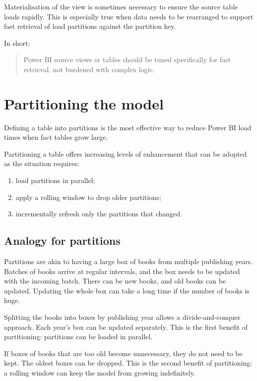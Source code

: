 \documentclass[10pt,openany,10pt]{book}
\providecommand{\tightlist}{%
  \setlength{\itemsep}{0pt}\setlength{\parskip}{0pt}}
\begin{document}
Materialisation of the view is sometimes necessary to ensure the source
table loads rapidly. This is especially true when data needs to be
rearranged to support fast retrieval of load partitions against the
partition key.

In short:

\begin{quote}
Power BI source views or tables should be tuned specifically for fast
retrieval, not burdened with complex logic.
\end{quote}

\section{Partitioning the model}\label{partitioning-the-model}

Defining a table into partitions is the most effective way to reduce
Power BI load times when fact tables grow large.

Partitioning a table offers increasing levels of enhancement that can be
adopted as the situation requires:

\begin{enumerate}
\def\labelenumi{\arabic{enumi}.}
\tightlist
\item
  load partitions in parallel;
\item
  apply a rolling window to drop older partitions;
\item
  incrementally refresh only the partitions that changed.
\end{enumerate}

\subsection{Analogy for partitions}\label{analogy-for-partitions}

Partitions are akin to having a large box of books from multiple
publishing years. Batches of books arrive at regular intervals, and the
box needs to be updated with the incoming batch. There can be new books,
and old books can be updated. Updating the whole box can take a long
time if the number of books is huge.

Splitting the books into boxes by publishing year allows a
divide-and-conquer approach. Each year's box can be updated separately.
This is the first benefit of partitioning: partitions can be loaded in
parallel.

If boxes of books that are too old become unnecessary, they do not need
to be kept. The oldest boxes can be dropped. This is the second benefit
of partitioning: a rolling window can keep the model from growing
indefinitely.
\end{document}

